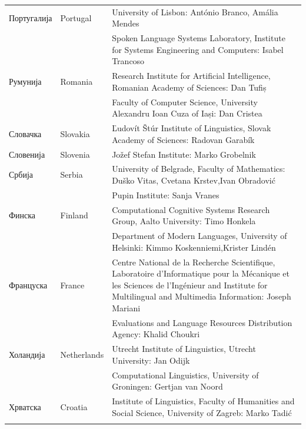 {\begin{longtable}{llp{114mm}}
  Португалија & \textcolor{grey1}{Portugal} & University of Lisbon: António Branco, Amália Mendes \\ \addlinespace
  & & Spoken Language Systems Laboratory, Institute for Systems Engineering and Computers: Isabel Trancoso \\ \addlinespace
  Румунија & \textcolor{grey1}{Romania} & Research Institute for Artificial Intelligence, Romanian Academy of Sciences: Dan Tufiș \\ \addlinespace
  & & Faculty of Computer Science, University Alexandru Ioan Cuza of Iași: Dan Cristea \\ \addlinespace
  Словачка & \textcolor{grey1}{Slovakia} & Ľudovít Štúr Institute of Linguistics, Slovak Academy of Sciences: Radovan Garabík \\ \addlinespace 
  Словенија & \textcolor{grey1}{Slovenia} & Jožef Stefan Institute: Marko Grobelnik \\ \addlinespace 
  Србија & \textcolor{grey1}{Serbia} & University of Belgrade, Faculty of Mathematics: Duško Vitas, Cvetana Krstev,\newline Ivan Obradović \\ \addlinespace
  & & Pupin Institute: Sanja Vranes \\ \addlinespace  
  Финска & \textcolor{grey1}{Finland} & Computational Cognitive Systems Research Group, Aalto University: Timo Honkela\\ \addlinespace
  & & Department of Modern Languages, University of Helsinki: Kimmo Koskenniemi,\newline Krister Lindén \\ \addlinespace
  Француска & \textcolor{grey1}{France} & Centre National de la Recherche Scientifique, Laboratoire d'Informatique pour la Mécanique et les Sciences de l'Ingénieur and Institute for Multilingual and Multimedia Information: Joseph Mariani \\ \addlinespace
  & & Evaluations and Language Resources Distribution Agency: Khalid Choukri\\ \addlinespace
  Холандија &  \textcolor{grey1}{Netherlands} & Utrecht Institute of Linguistics, Utrecht University: Jan Odijk\\ \addlinespace 
  & & Computational Linguistics, University of Groningen: Gertjan van Noord\\ \addlinespace
  Хрватска & \textcolor{grey1}{Croatia} & Institute of Linguistics, Faculty of Humanities and Social Science, University of Zagreb: Marko Tadić \\ \addlinespace 

\end{longtable}}
